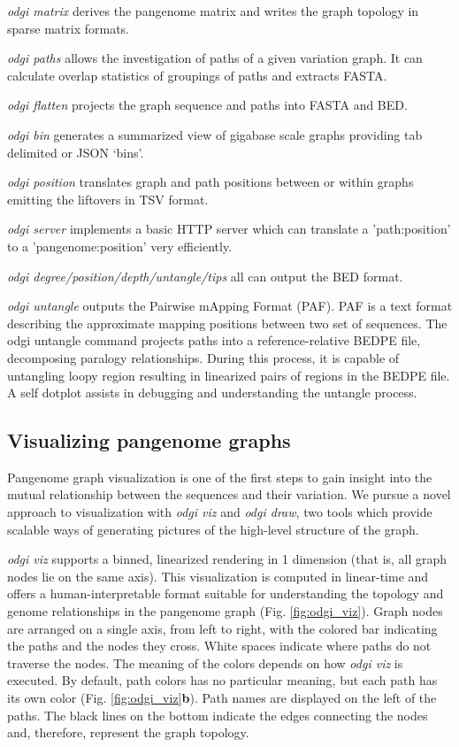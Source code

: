 \documentclass{bioinfo}
\begin{document}
\textit{odgi matrix} derives the pangenome matrix and writes the graph topology in sparse matrix formats.

\textit{odgi paths} allows the investigation of paths of a given variation graph. It can calculate overlap statistics of groupings of paths and extracts FASTA.

\textit{odgi flatten} projects the graph sequence and paths into FASTA and BED.

\textit{odgi bin} generates a summarized view of gigabase scale graphs providing tab delimited or JSON `bins'.

\textit{odgi position} translates graph and path positions between or within graphs emitting the liftovers in TSV format.

\textit{odgi server} implements a basic HTTP server which can translate a 'path:position' to a 'pangenome:position' very efficiently.

\textit{odgi degree/position/depth/untangle/tips} all can output the BED format.

\textit{odgi untangle} outputs the Pairwise mApping Format (PAF). PAF is a text format describing the approximate mapping positions between two set of sequences.
The odgi untangle command projects paths into a reference-relative BEDPE file, decomposing paralogy relationships.
During this process, it is capable of untangling loopy region resulting in linearized pairs of regions in the BEDPE file. A self dotplot assists in debugging and understanding the untangle process.


\subsection{Visualizing pangenome graphs}
\label{sec:viz}


Pangenome graph visualization is one of the first steps to gain insight into the mutual relationship between the sequences and their variation.
We pursue a novel approach to visualization with \textit{odgi viz} and \textit{odgi draw}, two tools which provide scalable ways of generating pictures of the high-level structure of the graph.

\textit{odgi viz} supports a binned, linearized rendering in 1 dimension (that is, all graph nodes lie on the same axis).
This visualization is computed in linear-time and offers a human-interpretable format suitable for understanding the topology and genome relationships in the pangenome graph (Fig. \ref{fig:odgi_viz}).
Graph nodes are arranged on a single axis, from left to right, with the colored bar indicating the paths and the nodes they cross.
White spaces indicate where paths do not traverse the nodes.
The meaning of the colors depends on how \textit{odgi viz} is executed.
By default, path colors has no particular meaning, but each path has its own color (Fig. \ref{fig:odgi_viz}\textbf{b}).
Path names are displayed on the left of the paths.
The black lines on the bottom indicate the edges connecting the nodes and, therefore, represent the graph topology.
\end{document}
